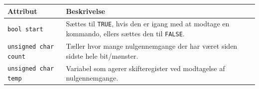 \begin{table}[h!]
\centering
\begin{tabularx}{13 cm}{|l |X|} \hline
Attribut & Beskrivelse \\ \hline

\texttt{bool start} & Sættes til \texttt{TRUE}, hvis den er igang med at modtage en kommando, ellers sættes den til \texttt{FALSE}. \\ \hline
\texttt{unsigned char count} & Tæller hvor mange nulgennemgange der har været siden sidste hele bit/mønster. \\ \hline
\texttt{unsigned char temp} & Variabel som agerer skifteregister ved modtagelse af nulgennemgange. \\ \hline
\end{tabularx}
\end{table}

\clearpage